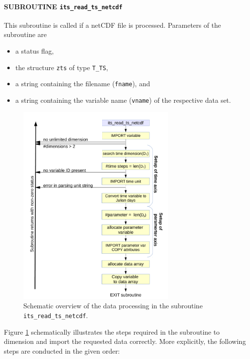 \documentclass[11pt,twoside]{report}
\begin{document}
\paragraph{SUBROUTINE \color{blue}\tt\bf  its\_read\_ts\_netcdf\label{ITSreadcdf}\\}
This subroutine is called if a netCDF file is processed.
Parameters of the subroutine are 
\begin{itemize}
\item a status flag,
\item  the structure \verb|zts| of type \verb|T_TS|,
\item a string containing the filename (\verb|fname|),
 and 
\item a string containing the variable name (\verb|vname|) of the
respective data set. 
\end{itemize}
\begin{figure}
\includegraphics[width=0.7\textwidth]{TS_read_netCDF.pdf}
\caption{Schematic overview of the data processing in the subroutine
{\tt its\_read\_ts\_netcdf}\label{fig:TSreadnetcdf}.}
\end{figure}
Figure \ref{fig:TSreadnetcdf} schematically illustrates the steps
required in the subroutine to dimension and import the requested data correctly.
More explicitly, the following steps are conducted in the given order: 
\end{document}
